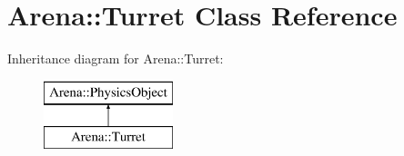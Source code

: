 \hypertarget{class_arena_1_1_turret}{\section{Arena\+:\+:Turret Class Reference}
\label{class_arena_1_1_turret}
}
Inheritance diagram for Arena\+:\+:Turret\+:\begin{figure}[H]
\begin{center}
\leavevmode
\includegraphics[height=2.000000cm]{class_arena_1_1_turret}
\end{center}
\end{figure}
